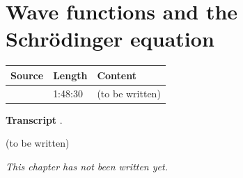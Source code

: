 \chapter{Wave functions and the Schrödinger equation}\label{ch:c03}
\begin{paracol}{2}

\begin{sources}
\begin{tabularx}{\linewidth}{@{}l l L@{}}
\toprule
\textbf{Source} & \textbf{Length} & \textbf{Content}\\
\midrule
{} & 1:48:30 & (to be written)\\
\bottomrule
\end{tabularx}

\smallskip
\textbf{Transcript} .
\end{sources}

\begin{reading}
(to be written)
\end{reading}

\emph{This chapter has not been written yet.}

\flushside
\end{paracol}
